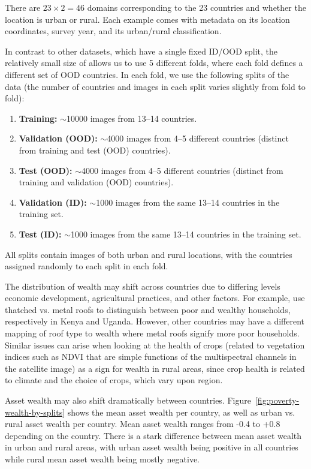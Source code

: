 There are $23 \times 2 = 46$ domains corresponding to the 23 countries and whether the location is urban or rural.
Each example comes with metadata on its location coordinates, survey year, and its urban/rural classification.

In contrast to other datasets, which have a single fixed ID/OOD split, the relatively small size of \PovertyMap allows us to use 5 different folds, where each fold defines a different set of OOD countries.
In each fold, we use the following splits of the data (the number of countries and images in each split varies slightly from fold to fold):
\begin{enumerate}
    \item \textbf{Training:} $\sim$10000 images from 13--14 countries.
    \item \textbf{Validation (OOD):} $\sim$4000 images from 4--5 different countries (distinct from training and test (OOD) countries).
    \item \textbf{Test (OOD):} $\sim$4000 images from 4--5 different countries (distinct from training and validation (OOD) countries).
    \item \textbf{Validation (ID):} $\sim$1000 images from the same 13--14 countries in the training set.
    \item \textbf{Test (ID):} $\sim$1000 images from the same 13--14 countries in the training set.
\end{enumerate}
All splits contain images of both urban and rural locations, with the countries assigned randomly to each split in each fold.

The distribution of wealth may shift across countries due to differing levels economic development, agricultural practices, and other factors. For example, \citet{abelson2014poor} use thatched vs. metal roofs to distinguish between poor and wealthy households, respectively in Kenya and Uganda. However, other countries may have a different mapping of roof type to wealth where metal roofs signify more poor households. Similar issues can arise when looking at the health of crops (related to vegetation indices such as NDVI that are simple functions of the multispectral channels in the satellite image) as a sign for wealth in rural areas, since crop health is related to climate and the choice of crops, which vary upon region.

Asset wealth may also shift dramatically between countries. Figure~\ref{fig:poverty-wealth-by-splits} shows the mean asset wealth per country, as well as urban vs. rural asset wealth per country.
Mean asset wealth ranges from -0.4 to +0.8 depending on the country.
There is a stark difference between mean asset wealth in urban and rural areas, with urban asset wealth being positive in all countries while rural mean asset wealth being mostly negative.

